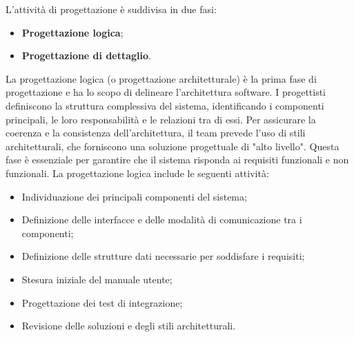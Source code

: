 \label{fasi-progettazione}
\par L'attività di progettazione è suddivisa in due fasi:
\begin{itemize}
  \item \textbf{Progettazione logica};
  \item \textbf{Progettazione di dettaglio}.
\end{itemize}

\label{progettazione-logica}
\par La progettazione logica (o progettazione architetturale) è la prima fase di progettazione e ha lo scopo di delineare l'architettura software. I progettisti definiscono la struttura complessiva del sistema, identificando i componenti principali, le loro responsabilità e le relazioni tra di essi. Per assicurare la coerenza e la consistenza dell'architettura, il team prevede l'uso di stili architetturali, che forniscono una soluzione progettuale di "alto livello". Questa fase è essenziale per garantire che il sistema risponda ai requisiti funzionali e non funzionali. La progettazione logica include le seguenti attività:
\begin{itemize}
  \item Individuazione dei principali componenti del sistema;
  \item Definizione delle interfacce e delle modalità di comunicazione tra i componenti;
  \item Definizione delle strutture dati necessarie per soddisfare i requisiti;
  \item Stesura iniziale del manuale utente;
  \item Progettazione dei test di integrazione;
  \item Revisione delle soluzioni e degli stili architetturali.
\end{itemize}


